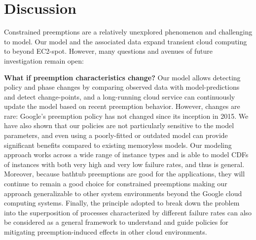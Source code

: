 \vspace*{\subsecspace}
\section{Discussion}
\label{sec:discussion}


Constrained preemptions are a relatively unexplored phenomenon and challenging to model.
Our model and the associated data expand transient cloud computing to beyond EC2-spot.
However, many questions and avenues of future investigation remain open:

\noindent \textbf{What if preemption characteristics change?}
Our model allows detecting policy and phase changes by comparing observed data with model-predictions and detect change-points, and 
a long-running cloud service can continuously update the model based on recent preemption behavior. 
However, changes are rare: Google's preemption policy has not changed since its inception in 2015. 
%
%
%
We have also shown that our policies are not particularly sensitive to the model parameters, and even using a poorly-fitted or outdated model can provide significant benefits compared to existing memoryless models. 
Our modeling approach works across a wide range of instance types and is able to model CDFs of instances with both very high and very low failure rates, and thus is general. Moreover, because bathtub preemptions are good for the applications, they will continue to remain a good choice for constrained preemptions making our approach generalizable to other system environments beyond the Google cloud computing systems. Finally, the principle adopted to break down the problem into the superposition of processes characterized by different failure rates can also be considered as a general framework to understand and guide policies for mitigating preemption-induced effects in other cloud environments.

